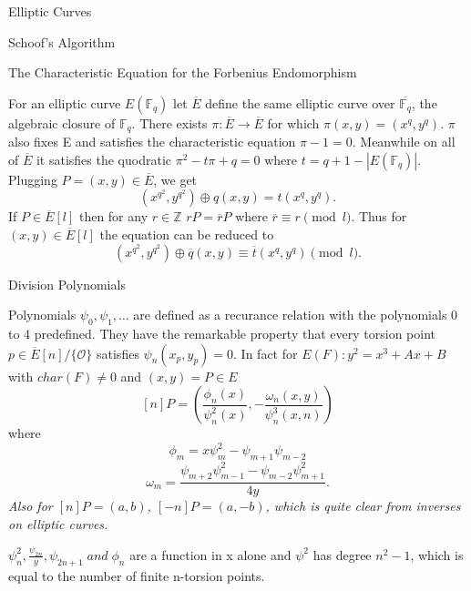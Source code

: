 \documentclass[12pt, letterpaper]{article}
\begin{document}
\begin{section}{Elliptic Curves}
\begin{subsection}{Schoof's Algorithm}
    \newpage

    \begin{subsubsection}{The Characteristic Equation for the Forbenius
        Endomorphism}

      For an elliptic curve \(E(\mathbb{F}_{q})\) let \(\overline{E}\) define the
      same elliptic curve over \(\overline{\mathbb{F}_{q}}\), the algebraic closure
      of \(\mathbb{F}_{q}\). There exists \(\pi : \overline{E} \to \overline{E}\) for
      which \(\pi(x, y) = (x^{q}, y^{q})\). \(\pi\) also fixes E and satisfies
      the characteristic equation \(\pi - 1 = 0\). Meanwhile on all of
      \(\overline{E}\) it satisfies the quodratic \(\pi^{2} - t \pi + q = 0\) where
      \(t = q + 1 - | E(\mathbb{F}_{q}) |\). \\
      Plugging \(P = (x, y) \in \overline{E}\), we get \[(x^{q^{2}}, y^{q^{2}})
        \oplus q(x, y) = t(x^{q}, y^{q}).\] If \(P \in \overline{E}[l]\) then for any
      \(r \in \mathbb{Z}\) \(rP = \overline{r}P\) where \(\overline{r} \equiv r
      \pmod{l}\). Thus for \((x, y) \in \overline{E}[l]\) the equation can be
      reduced to
      \[(x^{q^{2}}, y^{q^{2}}) \oplus \overline{q}(x, y) \equiv
        \overline{t}(x^{q}, y^{q}) \pmod{l}.\]

    \end{subsubsection}

    \begin{subsubsection}{Division Polynomials}

      Polynomials \(\psi_{0}, \psi_{1}, \dots\) are defined as a recurance
      relation with the polynomials 0 to 4 predefined. They have the remarkable
      property that every torsion point \(p \in \overline{E}[n] / \{ \mathcal{O} \}\)
      satisfies \(\psi_{n}(x_{p}, y_{p}) = 0\). In fact for \(E(F) : y^{2} =
      x^{3} + Ax + B\) with \(char(F) \neq 0\) and \((x, y) = P \in E\)
      \[[n]P = \left( \frac{\phi_{n}(x)}{\psi_{n}^{2}(x)},
        -\frac{\omega_{n}(x, y)}{\psi_{n}^{3}(x, n)} \right)\]
      where \[\phi_{m} = x \psi_{m}^{2} - \psi_{m + 1} \psi_{m - 2}\]
      \[\omega_{m} = \frac{\psi_{m + 2} \psi_{m - 1}^{2} - \psi_{m - 2}
          \psi_{m + 1}^{2}}{4y}.\]
      \textit{Also for \([n]P = (a, b)\), \([-n]P = (a, -b)\), which is quite clear
        from inverses on elliptic curves.}

      \(\psi_{n}^{2}, \frac{\psi_{2n}}{y}, \psi_{2n + 1} \; and \; \phi_{n}\)
      are a function in x alone and \(\psi^{2}\) has degree \(n^{2} - 1\),
      which is equal to the number of finite n-torsion points.


\end{subsubsection}
\end{subsection}
\end{section}
\end{document}
